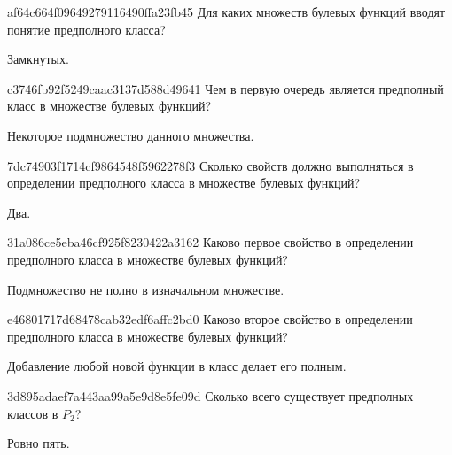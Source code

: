 \begin{note}{af64c664f09649279116490ffa23fb45}
    Для каких множеств булевых функций вводят понятие предполного класса?

    \begin{cloze}{1}
        Замкнутых.
    \end{cloze}
\end{note}

\begin{note}{c3746fb92f5249caac3137d588d49641}
    Чем в первую очередь является предполный класс в множестве булевых функций?

    \begin{cloze}{1}
        Некоторое подмножество данного множества.
    \end{cloze}
\end{note}

\begin{note}{7dc74903f1714cf9864548f5962278f3}
    Сколько свойств должно выполняться в определении предполного класса в множестве булевых функций?

    \begin{cloze}{1}
        Два.
    \end{cloze}
\end{note}

\begin{note}{31a086ce5eba46cf925f8230422a3162}
    Каково первое свойство в определении предполного класса в множестве булевых функций?

    \begin{cloze}{1}
        Подмножество не полно в изначальном множестве.
    \end{cloze}
\end{note}

\begin{note}{e46801717d68478cab32edf6affc2bd0}
    Каково второе свойство в определении предполного класса в множестве булевых функций?

    \begin{cloze}{1}
        Добавление любой новой функции в класс делает его полным.
    \end{cloze}
\end{note}

\begin{note}{3d895adaef7a443aa99a5e9d8e5fe09d}
    Сколько всего существует предполных классов в \({ P_2 }\)?

    \begin{cloze}{1}
        Ровно пять.
    \end{cloze}
\end{note}

